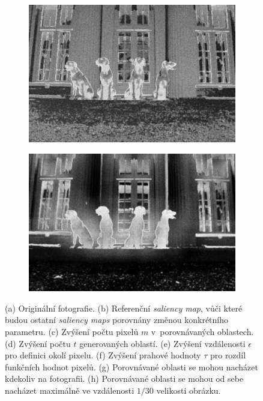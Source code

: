 \begin{figure}[H]
    \begin{subfigure}{0.4\textwidth}
      \centering
      \includegraphics[scale=1.0]{obrazky/StentifordSM-allimage.jpg}
      \caption{}
      \label{obr:salmapParamsG}
    \end{subfigure}
    \begin{subfigure}{0.4\textwidth}
      \centering
      \includegraphics[scale=1.0]{obrazky/StentifordSM-all30.jpg}
      \caption{}
      \label{obr:salmapParamsH}
    \end{subfigure}
    \vspace{1pt}
    
\caption{(a) Originální fotografie. (b) Referenční \emph{saliency map}, vůči které budou ostatní \emph{saliency maps} porovnány změnou konkrétního parametru. (c) Zvýšení počtu pixelů $m$ v~porovnávaných oblastech. (d) Zvýšení počtu $t$ generovaných oblastí. (e) Zvýšení vzdálenosti $\epsilon$ pro definici okolí pixelu. (f) Zvýšení prahové hodnoty $\tau$ pro rozdíl funkčních hodnot pixelů. (g) Porovnávané oblasti se mohou nacházet kdekoliv na fotografii. (h) Porovnávané oblasti se mohou od sebe nacházet maximálně ve vzdálenosti $1/30$ velikosti obrázku.}
\label{obr:salmapParams}
\end{figure}


